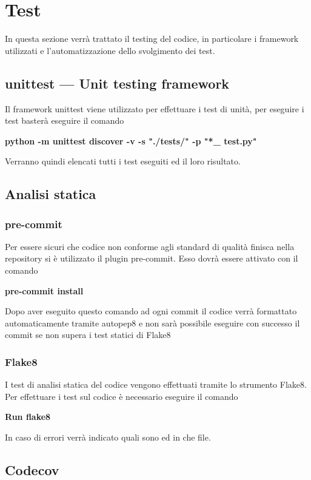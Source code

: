 \section{Test}

In questa sezione verrà trattato il testing del codice, in particolare i framework utilizzati e l'automatizzazione dello svolgimento dei test.

\subsection{unittest — Unit testing framework}

Il framework unittest viene utilizzato per effettuare i test di unità, per eseguire i test basterà eseguire il comando 

\centerline{ \textbf{python -m unittest discover -v -s "./tests/" -p "*\_ test.py"}}

Verranno quindi elencati tutti i test eseguiti ed il loro risultato.


\subsection{Analisi statica}

\subsubsection{pre-commit}

Per essere sicuri che codice non conforme agli standard di qualità finisca nella repository si è utilizzato il plugin pre-commit. Esso dovrà essere attivato con il comando

\centerline{\textbf{pre-commit install}}

Dopo aver eseguito questo comando ad ogni commit il codice verrà formattato automaticamente tramite autopep8 e non sarà possibile eseguire con successo il commit se non supera i test statici di Flake8

\subsubsection{Flake8}

I test di analisi statica del codice vengono effettuati tramite lo strumento Flake8. Per effettuare i test sul codice è necessario eseguire il comando

\centerline{\textbf{Run flake8}}
In caso di errori verrà indicato quali sono ed in che file. 

\subsection{Codecov}

